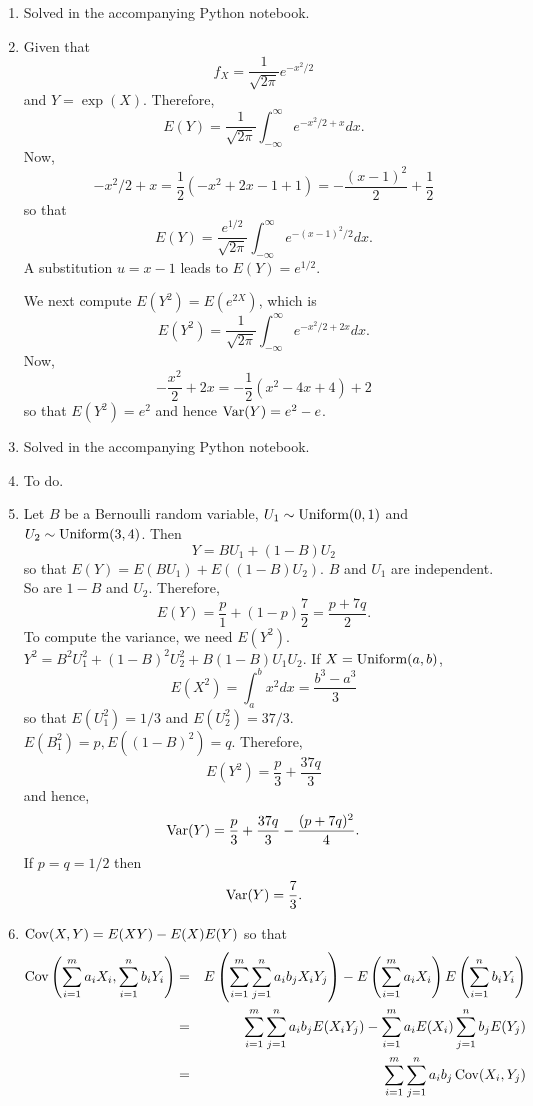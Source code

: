 \documentclass{article}
\begin{document}
\begin{enumerate}
\item Solved in the accompanying Python notebook.

\item Given that 
\[
f_X = \frac{1}{\sqrt{2\pi}}e^{-x^2/2}
\]
and $Y = \exp(X)$. Therefore,
\[
E(Y) = \frac{1}{\sqrt{2\pi}}\int_{-\infty}^\infty e^{-x^2/2 + x} dx.
\]
Now,
\[
-x^2/2 + x = \frac{1}{2}(-x^2 + 2x - 1 + 1) = -\frac{(x-1)^2}{2} + \frac{1}{2}
\]
so that
\[
E(Y) = \frac{e^{1/2}}{\sqrt{2\pi}}\int_{-\infty}^\infty e^{-(x - 1)^2/2}dx.
\]
A substitution $u = x - 1$ leads to $E(Y) = e^{1/2}$.

We next compute $E(Y^2) = E(e^{2X})$, which is
\[
E(Y^2) = \frac{1}{\sqrt{2\pi}}\int_{-\infty}^\infty e^{-x^2/2 + 2x} dx.
\]
Now,
\[
-\frac{x^2}{2} + 2x = -\frac{1}{2}(x^2 - 4x + 4) + 2
\] 
so that $E(Y^2) = e^2$ and hence $\operatorname{Var}(Y) = e^2 - e$.

\item Solved in the accompanying Python notebook.

\item To do.

\item Let $B$ be a Bernoulli random variable, $U_1 \sim \text{Uniform}(0, 1)$ and $U_2 
\sim \text{Uniform}(3, 4)$. Then
\[
Y = BU_1 + (1 - B)U_2
\]
so that $E(Y) = E(BU_1) + E((1 - B)U_2)$. $B$ and $U_1$ are independent. So are
$1 - B$ and $U_2$. Therefore, 
\[
E(Y) = \frac{p}{1} + (1 - p)\frac{7}{2} = \frac{p + 7q}{2}.
\]
To compute the variance, we need $E(Y^2)$. $Y^2 = B^2U_1^2 + (1 - B)^2U_2^2 +
B(1 - B)U_1U_2$. If $X = \text{Uniform}(a, b)$, 
\[
E(X^2) = \int_a^b x^2dx = \frac{b^3 - a^3}{3}
\]
so that $E(U_1^2) = 1/3$ and $E(U_2^2) = 37/3$. $E(B_1^2) = p, E((1 - B)^2) = q$.
Therefore,
\[
E(Y^2) = \frac{p}{3} + \frac{37q}{3}
\]
and hence,
\[
\operatorname{Var}(Y) = \frac{p}{3} + \frac{37q}{3} - \frac{(p + 7q)^2}{4}.
\]
If $p = q = 1/2$ then
\[
\operatorname{Var}(Y) = \frac{7}{3}.
\]

\item $\operatorname{Cov}(X, Y) = E(XY) - E(X)E(Y)$ so that
\begin{eqnarray*}
\operatorname{Cov}\left(\sum_{i=1}^ma_iX_i, \sum_{i=1}^nb_iY_i\right) &=& 
E\left(\sum_{i=1}^m\sum_{j=1}^na_ib_jX_iY_j\right) - 
E\left(\sum_{i=1}^ma_iX_i\right)E\left(\sum_{i=1}^nb_iY_i\right) \\
 &=& \sum_{i=1}^m\sum_{j=1}^na_ib_jE(X_iY_j) - 
 \sum_{i=1}^ma_iE(X_i)\sum_{j=1}^nb_jE(Y_j) \\
 &=& \sum_{i=1}^m\sum_{j=1}^na_ib_j\operatorname{Cov}(X_i, Y_j)
\end{eqnarray*}


\end{enumerate}
\end{document}
